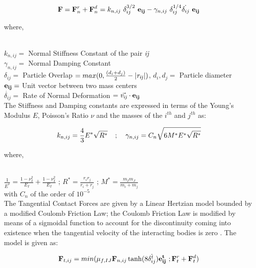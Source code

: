 \begin{eqnarray}
{\bf{F}} = {\bf{F}}_n^r + {\bf{F}}_n^d = k_{n,ij}~\delta _{ij}^{3/2}~{\bf{e_{ij}}} - \gamma _{n,ij} ~ \delta _{ij}^{1/4} \dot{\delta _{ij}}~\bf{e_{ij}}  
\end{eqnarray}

{\raggedright{where,}}\\
$k_{n,ij} = $ Normal Stiffness Constant of the pair \textit{ij}\\
$\gamma _{n,ij} = $ Normal Damping Constant\\
$\delta _{ij} = $ Particle Overlap $= max(0, \frac{(d_i + d_j)}{2} - {\bf{|{\it{r_{ij}}}|}})$, $d_i, d_j = $ Particle diameter\\
${\bf{e_{ij}}} = $ Unit vector between two mass centers\\
$\dot{\delta _{ij}} = $ Rate of Normal Deformation $= \vec{\it{v_{ij}}}\cdot {\bf{e_{ij}}}$\\

The Stiffness and Damping constants are expressed in terms of the Young's Modulus $E$, Poisson's Ratio $\nu$ and the masses of the $i^{th}$ and $j^{th}$ as:

\begin{eqnarray}
 k_{n,ij} = \frac{4}{3} E^* \sqrt{R^*} \hspace{0.375cm} ; \hspace{0.375cm} \gamma _{n,ij} = C_n \sqrt{6M^*E^* \sqrt{R^*}}
\end{eqnarray}

{\raggedright{where,}}\\
$\frac{1}{E^*} = \frac{1-\nu_I^2}{E_I}+\frac{1-\nu_I^2}{E_I}$ \hspace{0.375cm} ; \hspace{0.375cm} $R^* = \frac{r_i r_j}{r_i + r_j}$ \hspace{0.375cm} ; \hspace{0.375cm} $M^* = \frac{m_I m_J}{m_i + m_j}$\\
with $C_n$ of the order of $10^{-5}$\\


The Tangential Contact Forces are given by a Linear Hertzian model bounded by a modified Coulomb Friction Law; the Coulomb Friction Law is modified by means of a sigmoidal function to account for the discontinuity coming into existence when the tangential velocity of the interacting bodies is zero \cite{vetsch}. The model is given as:

\begin{eqnarray}
 {\bf{F}}_{t,ij} = min(\mu_{f,IJ} {\bf{F}}_{n,ij}\tanh(8\dot{\delta^t_{ij}}){\bf{e^t_{ij}}}~; {\bf{F}}_t^r + {\bf{F}}_t^d)
\end{eqnarray}

